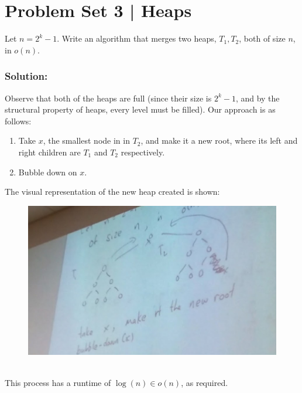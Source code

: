 \documentclass{report}
\begin{document}
\section*{Problem Set 3 | Heaps}
Let $n = 2^k - 1$. Write an algorithm that merges two heaps, $T_1, T_2$, both of size $n$, in $o(n)$.
\subsubsection{Solution:}
Observe that both of the heaps are full (since their size is $2^k - 1$, and by the structural property of heaps, every level must be filled). Our approach is as follows:
\begin{enumerate}
\item Take $x$, the smallest node in in $T_2$, and make it a new root, where its left and right children are $T_1$ and $T_2$ respectively.
\item Bubble down on $x$.
\end{enumerate}
The visual representation of the new heap created is shown:
\begin{figure}[ht]
\begin{center}
\includegraphics[scale=0.35]{heap1.jpg}
\end{center}
\end{figure}\\
This process has a runtime of $\log (n) \in o(n)$, as required.
\end{document}
